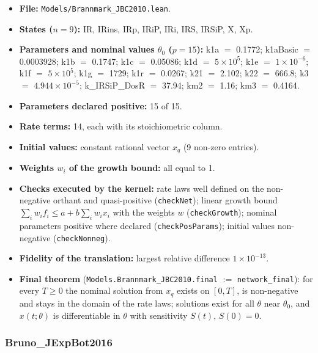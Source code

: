 \begin{itemize}\itemsep0pt\small
\item \textbf{File:} \texttt{Models/Brannmark\_JBC2010.lean}.
\item \textbf{States ($n=9$):} IR, IRins, IRp, IRiP, IRi, IRS, IRSiP, X, Xp.
\item \textbf{Parameters and nominal values $\theta_0$ ($p=15$):} k1a $=$ 0.1772; k1aBasic $=$ 0.0003928; k1b $=$ 0.1747; k1c $=$ 0.05086; k1d $=$ $5\times10^{5}$; k1e $=$ $1\times10^{-6}$; k1f $=$ $5\times10^{5}$; k1g $=$ 1729; k1r $=$ 0.0267; k21 $=$ 2.102; k22 $=$ 666.8; k3 $=$ $4.944\times10^{-5}$; k\_IRSiP\_DosR $=$ 37.94; km2 $=$ 1.16; km3 $=$ 0.4164.
\item \textbf{Parameters declared positive:} 15 of 15.
\item \textbf{Rate terms:} 14, each with its stoichiometric column.
\item \textbf{Initial values:} constant rational vector $x_q$ (9 non-zero entries).
\item \textbf{Weights $w_i$ of the growth bound:} all equal to 1.
\item \textbf{Checks executed by the kernel:} rate laws well defined on the non-negative orthant and quasi-positive (\texttt{checkNet}); linear growth bound $\sum_iw_if_i\le a+b\sum_iw_ix_i$ with the weights $w$ (\texttt{checkGrowth}); nominal parameters positive where declared (\texttt{checkPosParams}); initial values non-negative (\texttt{checkNonneg}).
\item \textbf{Fidelity of the translation:} largest relative difference $1\times10^{-13}$.
\item \textbf{Final theorem} (\texttt{Models.Brannmark\_JBC2010.final} $:=$ \texttt{network\_final}): for every $T\ge0$ the nominal solution from $x_q$ exists on $[0,T]$, is non-negative and stays in the domain of the rate laws; solutions exist for all $\theta$ near $\theta_0$, and $x(t;\theta)$ is differentiable in $\theta$ with sensitivity $S(t)$, $S(0)=0$.
\end{itemize}

\subsubsection*{Bruno\_JExpBot2016}

